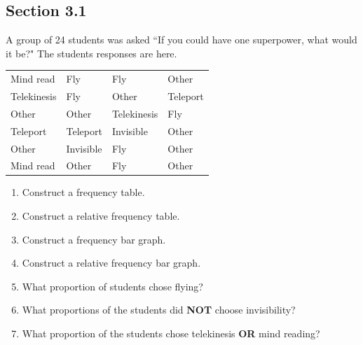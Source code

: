 \documentclass[12pt]{scrartcl}
\theoremstyle{definition}
\begin{document}
\subsection*{Section 3.1}
A group of 24 students was asked ``If you could have one superpower, what would it be?" The students responses are here.
\begin{center}
	\begin{tabular}{llll}
Mind read   & Fly       & Fly         & Other    \\
Telekinesis & Fly       & Other       & Teleport \\
Other       & Other     & Telekinesis & Fly      \\
Teleport    & Teleport  & Invisible   & Other    \\
Other       & Invisible & Fly         & Other    \\
Mind read   & Other     & Fly         & Other   
\end{tabular}
\end{center}
\begin{enumerate}[label=(\alph*)]
	\item Construct a frequency table.
	\item Construct a relative frequency table.
	\item Construct a frequency bar graph.
	\item Construct a relative frequency bar graph.
	\item What proportion of students chose flying?
	\item What proportions of the students did \textbf{NOT} choose invisibility?
	\item What proportion of the students chose telekinesis \textbf{OR} mind reading?
\end{enumerate}
\end{document}
